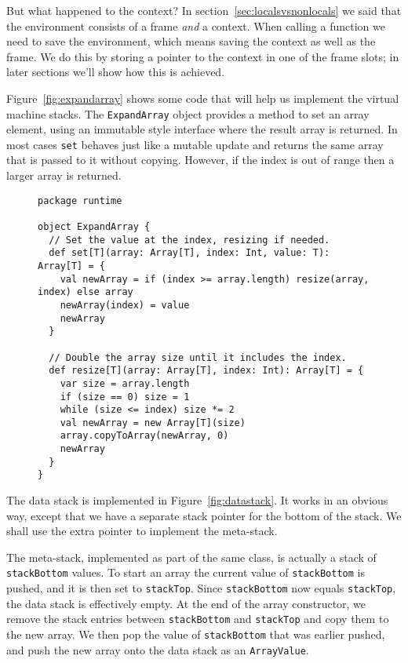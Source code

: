 But what happened to the context?
In section~\ref{sec:localsvsnonlocals} we said that the environment consists of
a frame \emph{and} a context.
When calling a function we need to save the environment,
which means saving the context as well as the frame.
We do this by storing a pointer to the context in one of the frame slots;
in later sections we'll show how this is achieved.

Figure~\ref{fig:expandarray} shows some code that will
help us implement the virtual machine stacks.
The \verb!ExpandArray! object provides a method to set an array element,
using an immutable style interface where the result array is returned.
In most cases \verb!set! behaves just like a mutable update
and returns the same array that is passed to it without copying.
However, if the index is out of range then a larger array is returned.

\begin{figure}
\begin{verbatim}
package runtime

object ExpandArray {
  // Set the value at the index, resizing if needed.
  def set[T](array: Array[T], index: Int, value: T): Array[T] = {
    val newArray = if (index >= array.length) resize(array, index) else array
    newArray(index) = value
    newArray
  }

  // Double the array size until it includes the index.
  def resize[T](array: Array[T], index: Int): Array[T] = {
    var size = array.length
    if (size == 0) size = 1
    while (size <= index) size *= 2
    val newArray = new Array[T](size)
    array.copyToArray(newArray, 0)
    newArray
  }
}
\end{verbatim}
\getcaption
\end{figure}

The data stack is implemented in Figure~\ref{fig:datastack}.
It works in an obvious way,
except that we have a separate stack pointer for the bottom of the stack.
We shall use the extra pointer to implement the meta-stack.

The meta-stack, implemented as part of the same class,
is actually a stack of \verb!stackBottom! values.
To start an array the current value of \verb!stackBottom! is pushed,
and it is then set to \verb!stackTop!.
Since \verb!stackBottom! now equals \verb!stackTop!,
the data stack is effectively empty.
At the end of the array constructor,
we remove the stack entries between \verb!stackBottom! and \verb!stackTop!
and copy them to the new array.
We then pop the value of \verb!stackBottom! that was earlier pushed,
and push the new array onto the data stack as an \verb!ArrayValue!.

